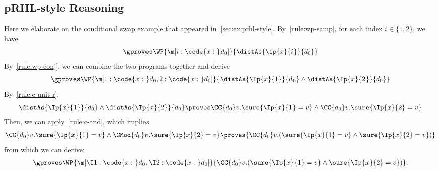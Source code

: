 \subsection{pRHL-style Reasoning}
\label{sec:appendix:ex:prhl}

Here we elaborate on the conditional swap example that appeared in~\cref{sec:ex:prhl-style}.
By~\cref{rule:wp-samp}, for each index $i \in \{1, 2\}$, we have
\begin{align*}
  \gproves \WP{\m[i: \code{x:~}d_0]}{\distAs{\ip{x}{i}}{d_0}}
\end{align*}
By~\cref{rule:wp-conj}, we can combine the two programs together and derive
\begin{align*}
  \gproves \WP{\m[1: \code{x:~}d_0, 2: \code{x:~}d_0]}{\distAs{\Ip{x}{1}}{d_0} \land \distAs{\Ip{x}{2}}{d_0}}
\end{align*}
By~\cref{rule:c-unit-r},
\[\distAs{\Ip{x}{1}}{d_0} \land \distAs{\Ip{x}{2}}{d_0} \proves
  \CC{d_0} v. \sure{\Ip{x}{1} = v} \land  \CC{d_0} v. \sure{\Ip{x}{2} = v}
\]
Then, we can apply~\cref{rule:c-and}, which implies
\[
  \CC{d_0} v. \sure{\Ip{x}{1} = v} \land  \CMod{d_0} v. \sure{\Ip{x}{2} = v}
  \proves
  {\CC{d_0} v. (\sure{\Ip{x}{1} = v} \land  \sure{\Ip{x}{2} = v})}
\]
from which we can derive:
\begin{align*}
  \gproves \WP{\m[\I1: \code{x:~}d_0, \I2: \code{x:~}d_0]}{\CC{d_0} v.(\sure{\Ip{x}{1}=v} \land \sure{\Ip{x}{2}=v})}.
\end{align*}

